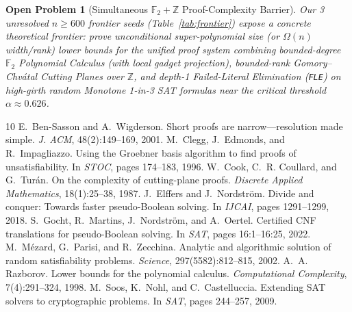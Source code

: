 \documentclass[11pt]{article}
\newtheorem*{openproblem}{Open Problem}
\begin{document}
\begin{openproblem}[Simultaneous $\mathbb{F}_2 + \mathbb{Z}$ Proof-Complexity Barrier]
Our 3 unresolved $n \ge 600$ frontier seeds (Table~\ref{tab:frontier}) expose a concrete theoretical frontier: prove unconditional super-polynomial size (or $\Omega(n)$ width/rank) lower bounds for the unified proof system combining bounded-degree $\mathbb{F}_2$ Polynomial Calculus (with local gadget projection), bounded-rank Gomory--Chv\'atal Cutting Planes over $\mathbb{Z}$, and depth-1 Failed-Literal Elimination (\texttt{FLE}) on high-girth random Monotone 1-in-3 SAT formulas near the critical threshold $\alpha \approx 0.626$.
\end{openproblem}

\small
\begin{thebibliography}{10}
\setlength{\itemsep}{2pt}
 E.~Ben-Sasson and A.~Wigderson. Short proofs are narrow---resolution made simple. \emph{J. ACM}, 48(2):149--169, 2001.
 M.~Clegg, J.~Edmonds, and R.~Impagliazzo. Using the Groebner basis algorithm to find proofs of unsatisfiability. In \emph{STOC}, pages 174--183, 1996.
 W.~Cook, C.~R. Coullard, and G.~Tur\'an. On the complexity of cutting-plane proofs. \emph{Discrete Applied Mathematics}, 18(1):25--38, 1987.
 J.~Elffers and J.~Nordstr\"om. Divide and conquer: Towards faster pseudo-Boolean solving. In \emph{IJCAI}, pages 1291--1299, 2018.
 S.~Gocht, R.~Martins, J.~Nordstr\"om, and A.~Oertel. Certified CNF translations for pseudo-Boolean solving. In \emph{SAT}, pages 16:1--16:25, 2022.
 M.~M\'ezard, G.~Parisi, and R.~Zecchina. Analytic and algorithmic solution of random satisfiability problems. \emph{Science}, 297(5582):812--815, 2002.
 A.~A. Razborov. Lower bounds for the polynomial calculus. \emph{Computational Complexity}, 7(4):291--324, 1998.
 M.~Soos, K.~Nohl, and C.~Castelluccia. Extending SAT solvers to cryptographic problems. In \emph{SAT}, pages 244--257, 2009.
\end{thebibliography}
\end{document}
